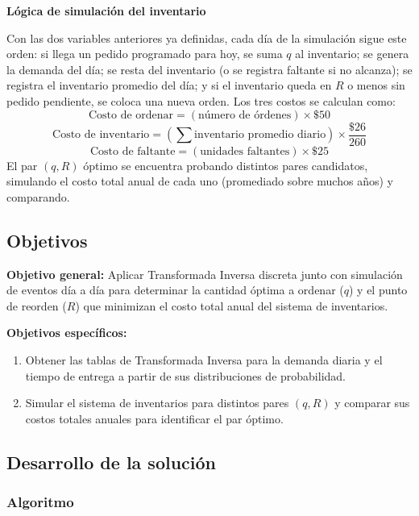 \textbf{Lógica de simulación del inventario}

Con las dos variables anteriores ya definidas, cada día de la simulación sigue este orden: si llega un pedido programado para hoy, se suma $q$ al inventario; se genera la demanda del día; se resta del inventario (o se registra faltante si no alcanza); se registra el inventario promedio del día; y si el inventario queda en $R$ o menos sin pedido pendiente, se coloca una nueva orden. Los tres costos se calculan como:
\[
\text{Costo de ordenar} = (\text{n\'umero de \'ordenes}) \times \$50
\]
\[
\text{Costo de inventario} = \left(\sum \text{inventario promedio diario}\right) \times \frac{\$26}{260}
\]
\[
\text{Costo de faltante} = (\text{unidades faltantes}) \times \$25
\]
El par $(q,R)$ óptimo se encuentra probando distintos pares candidatos, simulando el costo total anual de cada uno (promediado sobre muchos años) y comparando.

\subsection{Objetivos}

\textbf{Objetivo general:} Aplicar Transformada Inversa discreta junto con simulación de eventos día a día para determinar la cantidad óptima a ordenar ($q$) y el punto de reorden ($R$) que minimizan el costo total anual del sistema de inventarios.

\textbf{Objetivos específicos:}
\begin{enumerate}
    \item Obtener las tablas de Transformada Inversa para la demanda diaria y el tiempo de entrega a partir de sus distribuciones de probabilidad.
    \item Simular el sistema de inventarios para distintos pares $(q, R)$ y comparar sus costos totales anuales para identificar el par óptimo.
\end{enumerate}

\subsection{Desarrollo de la solución}

\subsubsection{Algoritmo}

